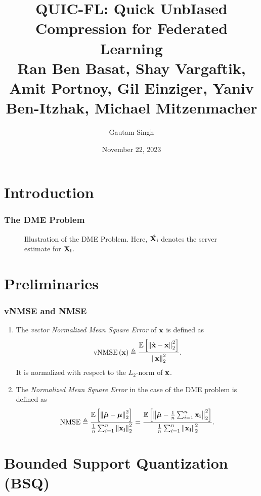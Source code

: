 \documentclass{beamer}
\title[QUIC-FL]{QUIC-FL: Quick UnbIased Compression for Federated Learning\\
\small Ran Ben Basat, Shay Vargaftik, Amit Portnoy, Gil Einziger, Yaniv Ben-Itzhak, Michael Mitzenmacher}
\date{November 22, 2023}
\author{Gautam Singh}
\institute[]{Indian Institute of Technology Hyderabad}
\begin{document}
    \maketitle
    \tableofcontents
    \section{Introduction}

    \begin{frame}
        \frametitle{The DME Problem}
        \begin{figure}[!ht]
            
            \caption{Illustration of the DME Problem. Here, \(\hat{\boldsymbol{\mathbf{X_i}}}\)
            denotes the server estimate for \(\boldsymbol{\mathbf{X_i}}\).} 
            \label{fig:dme}
        \end{figure}
    \end{frame}

    \section{Preliminaries}
    \begin{frame}
        \frametitle{vNMSE and NMSE}
        \begin{enumerate}
            \item The \emph{vector Normalized Mean Square Error} of \(\boldsymbol{\mathbf{x}}\)
            is defined as
            \begin{equation}
                \mathrm{vNMSE}\left(\boldsymbol{\mathbf{x}}\right) \triangleq \frac{\mathbb{E}\left[ \left\lVert\hat{\boldsymbol{\mathbf{x}}}-\boldsymbol{\mathbf{x}}\right\rVert^2_2 \right]}{\left\lVert\boldsymbol{\mathbf{x}}\right\rVert^2_2}.
                \label{eq:vnmse-def}
            \end{equation}
            It is normalized with respect to the \(L_2\)-norm of \(\boldsymbol{\mathbf{x}}\).
            \item The \emph{Normalized Mean Square Error} in the case of the DME
            problem is defined as
            \begin{equation}
                \mathrm{NMSE} \triangleq \frac{\mathbb{E}\left[ \left\lVert\hat{\boldsymbol{\mathbf{\mu}}}-\boldsymbol{\mathbf{\mu}}\right\rVert^2_2 \right]}{\frac{1}{n}\sum_{i=1}^n\left\lVert\boldsymbol{\mathbf{x_i}}\right\rVert^2_2} = \frac{\mathbb{E}\left[ \left\lVert\hat{\boldsymbol{\mathbf{\mu}}}-\frac{1}{n}\sum_{i=1}^n\boldsymbol{\mathbf{x_i}}\right\rVert^2_2 \right]}{\frac{1}{n}\sum_{i=1}^n\left\lVert\boldsymbol{\mathbf{x_i}}\right\rVert^2_2}.
                \label{eq:nmse-def}
            \end{equation}
        \end{enumerate}
    \end{frame}

    \section{Bounded Support Quantization (BSQ)}
    
\end{document}
